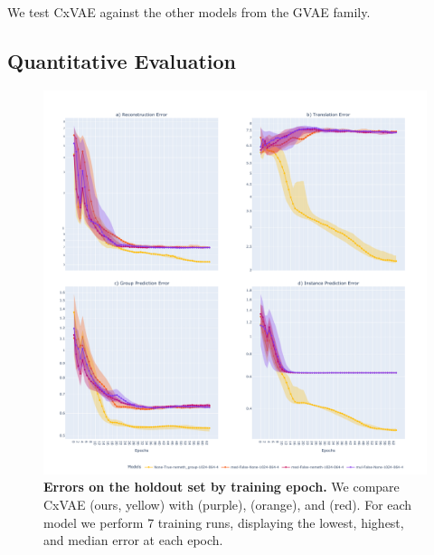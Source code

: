 \documentclass[nohyperref]{article}
\theoremstyle{plain}
\theoremstyle{definition}
\theoremstyle{remark}
\begin{document}
We test CxVAE against the other models from the GVAE family.

\subsection{Quantitative Evaluation}

\begin{figure}[ht]
    \vskip 0.2in
    \begin{center}
    \centerline{\includegraphics[width=\columnwidth]{files/results.pdf}}
    \caption{\textbf{Errors on the holdout set by training epoch.} We compare CxVAE (ours, yellow) with \citet{Bouchacourt2018MultiLevelVA} (purple), \citet{Hosoya2019GroupbasedLO} (orange), and
    \citet{Nmeth2020AdversarialDW} (red). For each model we perform 7 training runs, displaying the lowest, highest, and median error at each epoch.}
    \label{results}
    \end{center}
    \vskip -0.2in
\end{figure}
\end{document}
